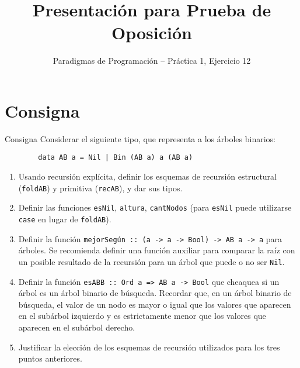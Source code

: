\documentclass[8pt]{beamer}
\title{Presentación para Prueba de Oposición}
\subtitle{Paradigmas de Programación -- Práctica 1, Ejercicio 12}
\begin{document}
\newcommand{\code}[1]{\texttt{#1}}

\begin{frame}
    \titlepage
\end{frame}

\section{Consigna}

\begin{frame}[fragile]{Consigna}
    Considerar el siguiente tipo, que representa a los árboles binarios:
    \begin{verbatim}
        data AB a = Nil | Bin (AB a) a (AB a)
    \end{verbatim}

    \begin{enumerate}[I]
        \item<2-> Usando recursión explícita, definir los esquemas de recursión estructural (\code{foldAB}) y primitiva (\code{recAB}), y dar sus tipos.
        \item<3-> Definir las funciones \code{esNil}, \code{altura}, \code{cantNodos} (para \code{esNil} puede utilizarse \code{case} en lugar de \code{foldAB}).
        \item<4-> Definir la función \code{mejorSegún :: (a -> a -> Bool) -> AB a -> a} para árboles. Se recomienda definir una función auxiliar para comparar la raíz con un posible resultado de la recursión para un árbol que puede o no ser \code{Nil}.
        \item<5-> Definir la función \code{esABB :: Ord a => AB a -> Bool} que cheaquea si un árbol es un árbol binario de búsqueda. Recordar que, en un árbol binario de búsqueda, el valor de un nodo es mayor o igual que los valores que aparecen en el subárbol izquierdo y es estrictamente menor que los valores que aparecen en el subárbol derecho.
        \item<6-> Justificar la elección de los esquemas de recursión utilizados para los tres puntos anteriores.
    \end{enumerate}

\end{frame}










\end{document}
